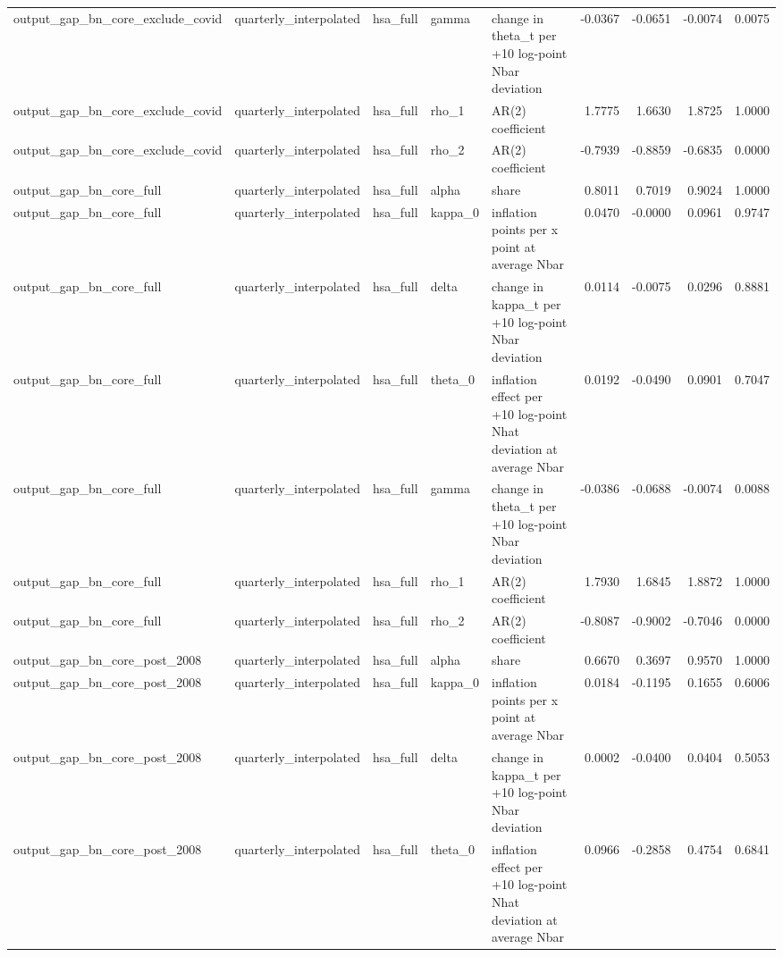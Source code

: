 \begin{tabular}{lllllrrrr}
output\_gap\_bn\_core\_exclude\_covid & quarterly\_interpolated & hsa\_full & gamma & change in theta\_t per +10 log-point Nbar deviation & -0.0367 & -0.0651 & -0.0074 & 0.0075 \\
output\_gap\_bn\_core\_exclude\_covid & quarterly\_interpolated & hsa\_full & rho\_1 & AR(2) coefficient & 1.7775 & 1.6630 & 1.8725 & 1.0000 \\
output\_gap\_bn\_core\_exclude\_covid & quarterly\_interpolated & hsa\_full & rho\_2 & AR(2) coefficient & -0.7939 & -0.8859 & -0.6835 & 0.0000 \\
output\_gap\_bn\_core\_full & quarterly\_interpolated & hsa\_full & alpha & share & 0.8011 & 0.7019 & 0.9024 & 1.0000 \\
output\_gap\_bn\_core\_full & quarterly\_interpolated & hsa\_full & kappa\_0 & inflation points per x point at average Nbar & 0.0470 & -0.0000 & 0.0961 & 0.9747 \\
output\_gap\_bn\_core\_full & quarterly\_interpolated & hsa\_full & delta & change in kappa\_t per +10 log-point Nbar deviation & 0.0114 & -0.0075 & 0.0296 & 0.8881 \\
output\_gap\_bn\_core\_full & quarterly\_interpolated & hsa\_full & theta\_0 & inflation effect per +10 log-point Nhat deviation at average Nbar & 0.0192 & -0.0490 & 0.0901 & 0.7047 \\
output\_gap\_bn\_core\_full & quarterly\_interpolated & hsa\_full & gamma & change in theta\_t per +10 log-point Nbar deviation & -0.0386 & -0.0688 & -0.0074 & 0.0088 \\
output\_gap\_bn\_core\_full & quarterly\_interpolated & hsa\_full & rho\_1 & AR(2) coefficient & 1.7930 & 1.6845 & 1.8872 & 1.0000 \\
output\_gap\_bn\_core\_full & quarterly\_interpolated & hsa\_full & rho\_2 & AR(2) coefficient & -0.8087 & -0.9002 & -0.7046 & 0.0000 \\
output\_gap\_bn\_core\_post\_2008 & quarterly\_interpolated & hsa\_full & alpha & share & 0.6670 & 0.3697 & 0.9570 & 1.0000 \\
output\_gap\_bn\_core\_post\_2008 & quarterly\_interpolated & hsa\_full & kappa\_0 & inflation points per x point at average Nbar & 0.0184 & -0.1195 & 0.1655 & 0.6006 \\
output\_gap\_bn\_core\_post\_2008 & quarterly\_interpolated & hsa\_full & delta & change in kappa\_t per +10 log-point Nbar deviation & 0.0002 & -0.0400 & 0.0404 & 0.5053 \\
output\_gap\_bn\_core\_post\_2008 & quarterly\_interpolated & hsa\_full & theta\_0 & inflation effect per +10 log-point Nhat deviation at average Nbar & 0.0966 & -0.2858 & 0.4754 & 0.6841 \\

\end{tabular}
